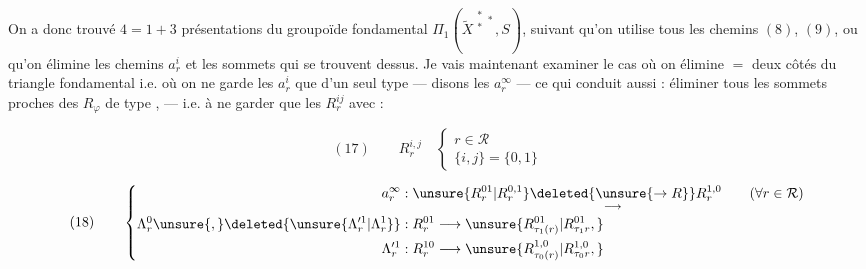 
On a donc trouvé $4=1+3$ présentations du groupoïde fondamental $\Pi_1(\widetilde{X}^{\substack{*\\*}*},S)$, suivant qu'on utilise tous les chemins $(8)$, $(9)$, ou qu'on élimine les chemins $a_r^i$  et les sommets qui se trouvent dessus. Je vais maintenant examiner le cas où on élimine $=$ deux côtés du triangle fondamental i.e. où on ne garde les $a_r^i$ que d'un seul type --- disons les $a_r^\infty$ --- ce qui conduit aussi : éliminer tous les sommets proches des $R_\varphi$  de type  ,   --- i.e.  à ne garder que les $R_r^{ij}$ avec    :

\noindent\begin{minipage}[c]{.54\linewidth}
\[
(17)\qquad R_r^{i,j}\quad\left\{\begin{array}{l}
r\in\mathcal{R}\\
\{i,j\}=\{0,1\}
\end{array}\right.
\]
\end{minipage}\hfill
\begin{minipage}[c]{.43\linewidth}
\end{minipage}

\[
(18)\qquad\left\{\begin{aligned}
a_r^\infty &: \unsure{R_r^{01}|R_r^{0,1}}\underset{\longrightarrow}{\deleted{\unsure{\to R}}}R_r^{1,0} \qquad(\forall r\in\mathcal{R})\\
\Lambda_r^0\unsure{,}\deleted{\unsure{\Lambda_r^{\prime1}|\Lambda_r^1}} &:R_r^{01}\longrightarrow\unsure{R_{\tau_1(r)}^{01}|R_{\tau_1r}^{01},}\\
\Lambda_r^{\prime1} &:R_r^{10}\longrightarrow\unsure{R_{\tau_0(r)}^{1,0}|R_{\tau_0r}^{1,0},}
\end{aligned}\right.
\]


